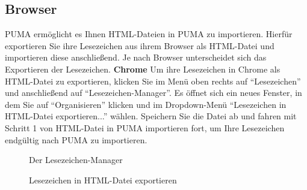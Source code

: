 \subsection{Browser}
PUMA ermöglicht es Ihnen HTML-Dateien in PUMA zu importieren. Hierfür exportieren Sie ihre Lesezeichen aus ihrem Browser als HTML-Datei und importieren diese anschließend. Je nach Browser unterscheidet sich das Exportieren der Lesezeichen.
\newline
\newline
\textbf{Chrome}%
\newline Um ihre Lesezeichen in Chrome als HTML-Datei zu exportieren, klicken Sie im Menü oben rechts auf \enquote{Lesezeichen} und anschließend auf \enquote{Lesezeichen-Manager}. Es öffnet sich ein neues Fenster, in dem Sie auf \enquote{Organisieren} klicken und im Dropdown-Menü \enquote{Lesezeichen in HTML-Datei exportieren...} wählen. Speichern Sie die Datei ab und fahren mit Schritt 1 von HTML-Datei in PUMA importieren fort, um Ihre Lesezeichen endgültig nach PUMA zu importieren.  
\begin{figure}[h!]
 \centering
 \caption{Der Lesezeichen-Manager}
 \label{figure013}
\end{figure}
\begin{figure}[ht]
 \centering
 \caption{Lesezeichen in HTML-Datei exportieren}
 \label{figure014}
\end{figure}

